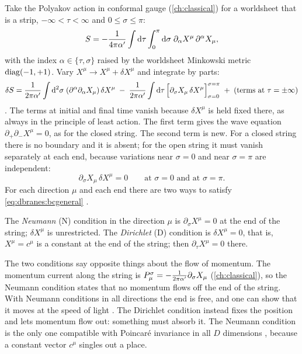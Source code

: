 Take the Polyakov action in conformal gauge (\cref{ch:classical}) for a worldsheet that is a
strip, $-\infty<\tau<\infty$ and $0\le\sigma\le\pi$:
\begin{equation}\label{eq:dbranes:action}
 S=-\frac1{4\pi\alpha'}\int\mathrm{d}\tau\int_0^\pi\mathrm{d}\sigma\;\partial_\alpha X^\mu\,\partial^\alpha X_\mu ,
\end{equation}
with the index $\alpha\in\{\tau,\sigma\}$ raised by the worldsheet Minkowski metric
$\operatorname{diag}(-1,+1)$. Vary $X^\mu\to X^\mu+\delta X^\mu$ and integrate by parts:
\begin{equation}\label{eq:dbranes:variation}
 \delta S=\frac1{2\pi\alpha'}\int\mathrm{d}^2\sigma\;(\partial^\alpha\partial_\alpha X_\mu)\,\delta X^\mu
 \;-\;\frac1{2\pi\alpha'}\int\mathrm{d}\tau\,\Big[\partial_\sigma X_\mu\,\delta X^\mu\Big]_{\sigma=0}^{\sigma=\pi}
 \;+\;(\text{terms at }\tau=\pm\infty)
\end{equation}
. The terms at initial and final time
vanish because $\delta X^\mu$ is held fixed there, as always in the principle of least action. The
first term gives the wave equation $\partial_+\partial_-X^\mu=0$, as for the closed string. The
second term is new. For a closed string there is no boundary and it is absent; for the open
string it must vanish separately at each end, because variations near $\sigma=0$ and near
$\sigma=\pi$ are independent:
\begin{equation}\label{eq:dbranes:bcgeneral}
 \partial_\sigma X_\mu\,\delta X^\mu=0\qquad\text{at }\sigma=0\text{ and at }\sigma=\pi .
\end{equation}
For each direction $\mu$ and each end there are two ways to satisfy
\eqref{eq:dbranes:bcgeneral} .

\begin{definition}\label{def:dbranes:ND}
The \emph{Neumann} (N) condition in the direction $\mu$ is $\partial_\sigma X^\mu=0$ at the end
of the string; $\delta X^\mu$ is unrestricted. The \emph{Dirichlet} (D) condition is
$\delta X^\mu=0$, that is, $X^\mu=c^\mu$ is a constant at the end of the string; then
$\partial_\tau X^\mu=0$ there.
\end{definition}

The two conditions say opposite things about the flow of momentum. The momentum current along
the string is $P^\sigma_\mu=-\frac1{2\pi\alpha'}\partial_\sigma X_\mu$ (\cref{ch:classical}), so the
Neumann condition states that no momentum flows off the end of the string. With Neumann
conditions in all directions the end is free, and one can show that it moves at the speed of
light . The Dirichlet condition instead fixes the position and
lets momentum flow out: something must absorb it. The Neumann condition is the only one
compatible with Poincar\'e invariance in all $D$ dimensions , because
a constant vector $c^\mu$ singles out a place.

